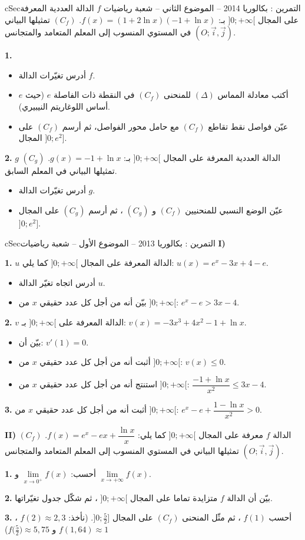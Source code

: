 \documentclass[12pt,a4paper]{article}
\newenvironment{BOX}[2]{\begin{otherlanguage}{english}\begin{arbox}{#1}{#2}}{\end{arbox}\end{otherlanguage}}
\newcounter{exo}
\newenvironment{tamrin}[1]{\stepcounter{exo}\begin{BOX}{cSec}{التمرين \theexo: #1}}{\end{BOX}}
\newenvironment{sq}{\begin{itemize}[leftmargin=2.4em,itemsep=3pt]}{\end{itemize}}
\newcommand{\qa}{\item[(أ)]}\newcommand{\qb}{\item[(ب)]}\newcommand{\qc}{\item[(جـ)]}\newcommand{\qd}{\item[(د)]}\newcommand{\qe}{\item[(هـ)]}
\newcommand{\QQ}[1]{\par\smallskip\textbf{#1.} }
\begin{document}
\begin{tamrin}{بكالوريا 2014 -- الموضوع الثاني -- شعبة رياضيات}
$f$ الدالة العددية المعرفة على المجال $]0;+\infty[$ بـ: $f(x)=(1+2\ln x)(-1+\ln x)$.
$(C_f)$ تمثيلها البياني في المستوي المنسوب إلى المعلم المتعامد والمتجانس $(O;\vec i,\vec j)$.
\QQ{1}
\begin{sq}
\qa أدرس تغيّرات الدالة $f$.
\qb أكتب معادلة المماس $(\Delta)$ للمنحنى $(C_f)$ في النقطة ذات الفاصلة $e$ (حيث $e$ أساس اللوغاريتم النيبيري).
\qc عيّن فواصل نقط تقاطع $(C_f)$ مع حامل محور الفواصل، ثم أرسم $(C_f)$ على المجال $]0;e^2]$.
\end{sq}
\QQ{2} $g$ الدالة العددية المعرفة على المجال $]0;+\infty[$ بـ: $g(x)=-1+\ln x$. $(C_g)$ تمثيلها البياني في المعلم السابق.
\begin{sq}
\qa أدرس تغيّرات الدالة $g$.
\qb عيّن الوضع النسبي للمنحنيين $(C_f)$ و $(C_g)$ ، ثم أرسم $(C_g)$ على المجال $]0;e^2]$.
\end{sq}
\end{tamrin}

\begin{tamrin}{بكالوريا 2013 -- الموضوع الأول -- شعبة رياضيات}
\textbf{I)} \QQ{1} $u$ الدالة المعرفة على المجال $]0;+\infty[$ كما يلي: $u(x)=e^x-3x+4-e$.
\begin{sq}
\qa أدرس اتجاه تغيّر الدالة $u$.
\qb بيّن أنه من أجل كل عدد حقيقي $x$ من $]0;+\infty[$: $e^x-e>3x-4$.
\end{sq}
\QQ{2} $v$ الدالة المعرفة على $]0;+\infty[$ بـ: $v(x)=-3x^3+4x^2-1+\ln x$.
\begin{sq}
\qa بيّن أن: $v'(1)=0$.
\qb أثبت أنه من أجل كل عدد حقيقي $x$ من $]0;+\infty[$: $v(x)\leq0$.
\qc استنتج أنه من أجل كل عدد حقيقي $x$ من $]0;+\infty[$: $\dfrac{-1+\ln x}{x^2}\leq3x-4$.
\end{sq}
\QQ{3} أثبت أنه من أجل كل عدد حقيقي $x$ من $]0;+\infty[$: $e^x-e+\dfrac{1-\ln x}{x^2}>0$.

\textbf{II)} الدالة $f$ معرفة على المجال $]0;+\infty[$ كما يلي: $f(x)=e^x-ex+\dfrac{\ln x}{x}$.
$(C_f)$ تمثيلها البياني في المستوي المنسوب إلى المعلم المتعامد والمتجانس $(O;\vec i,\vec j)$.
\QQ{1} أحسب: $\lim\limits_{x\to0^{+}}f(x)$ و $\lim\limits_{x\to+\infty}f(x)$.
\QQ{2} بيّن أن الدالة $f$ متزايدة تماما على المجال $]0;+\infty[$ ، ثم شكّل جدول تغيّراتها.
\QQ{3} أحسب $f(1)$ ، ثم مثّل المنحنى $(C_f)$ على المجال $\big]0;\frac52\big]$. (نأخذ: $f(2)\approx2{,}3$ ، $f(1{,}64)\approx1$ و $f\big(\frac52\big)\approx5{,}75$)
\end{tamrin}
\end{document}
